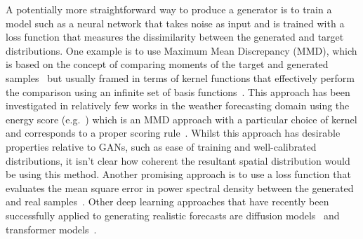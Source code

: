 \documentclass[../main.tex]{subfiles}
\begin{document}
A potentially more straightforward way to produce a generator is to train a model such as a neural network that takes noise as input and is trained with a loss function that measures the dissimilarity between the generated and target distributions. One example is to use Maximum Mean Discrepancy (MMD), which is based on the concept of comparing moments of the target and generated samples~\citep{li_generative_2015, dziugaite_training_2015} but usually framed in terms of kernel functions that effectively perform the comparison using an infinite set of basis functions~\citep{murphy_probabilistic_2022}. This approach has been investigated in relatively few works in the weather forecasting domain using the energy score (e.g.~\citep{pacchiardi_probabilistic_2021}) which is an MMD approach with a particular choice of kernel and corresponds to a proper scoring rule~\citep{gneiting_strictly_2007}. Whilst this approach has desirable properties relative to GANs, such as ease of training and well-calibrated distributions, it isn't clear how coherent the resultant spatial distribution would be using this method. Another promising approach is to use a loss function that evaluates the mean square error in power spectral density between the generated and real samples~\citep{singh_numerical_2019}. Other deep learning approaches that have recently been successfully applied to generating realistic forecasts are diffusion models~\citep{li_seeds_2023, addison_machine_2022, leinonen_latent_2023} and transformer models~\citep{ben-bouallegue_improving_2023}.








\end{document}
